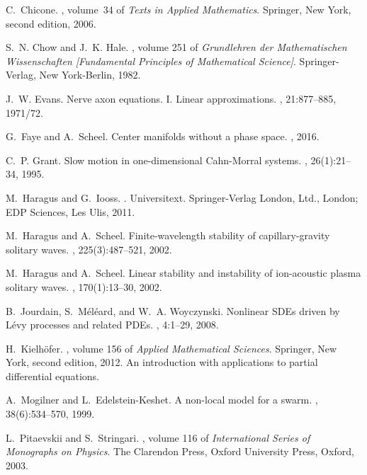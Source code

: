 \documentclass[10pt]{article}
\begin{document}
\begin{thebibliography}{10}
C.~Chicone.
, volume~34 of
  {\em Texts in Applied Mathematics}.
\newblock Springer, New York, second edition, 2006.

S.~N. Chow and J.~K. Hale.
, volume 251 of {\em Grundlehren
  der Mathematischen Wissenschaften [Fundamental Principles of Mathematical
  Science]}.
\newblock Springer-Verlag, New York-Berlin, 1982.

J.~W. Evans.
\newblock Nerve axon equations. {I}. {L}inear approximations.
, 21:877--885, 1971/72.

G.~Faye and A.~Scheel.
\newblock Center manifolds without a phase space.
, 2016.

C.~P. Grant.
\newblock Slow motion in one-dimensional {C}ahn-{M}orral systems.
, 26(1):21--34, 1995.

M.~Haragus and G.~Iooss.
.
\newblock Universitext. Springer-Verlag London, Ltd., London; EDP Sciences, Les
  Ulis, 2011.

M.~Haragus and A.~Scheel.
\newblock Finite-wavelength stability of capillary-gravity solitary waves.
, 225(3):487--521, 2002.

M.~Haragus and A.~Scheel.
\newblock Linear stability and instability of ion-acoustic plasma solitary
  waves.
, 170(1):13--30, 2002.

B.~Jourdain, S.~M\'el\'eard, and W.~A. Woyczynski.
\newblock Nonlinear {SDE}s driven by {L}\'evy processes and related {PDE}s.
, 4:1--29, 2008.

H.~Kielh\"ofer.
, volume 156 of {\em Applied Mathematical
  Sciences}.
\newblock Springer, New York, second edition, 2012.
\newblock An introduction with applications to partial differential equations.

A.~Mogilner and L.~Edelstein-Keshet.
\newblock A non-local model for a swarm.
, 38(6):534--570, 1999.

L.~Pitaevskii and S.~Stringari.
, volume 116 of {\em International
  Series of Monographs on Physics}.
\newblock The Clarendon Press, Oxford University Press, Oxford, 2003.


\end{thebibliography}
\end{document}
